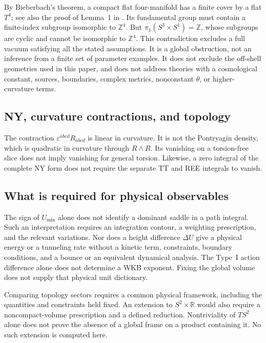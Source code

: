 By Bieberbach's theorem, a compact flat four-manifold has a finite
cover by a flat $T^4$; see also the proof of Lemma~1 in \cite{LeBrun2009}.
Its fundamental group must contain a finite-index subgroup
isomorphic to $\mathbb Z^4$.
But $\pi_1(S^3\times S^1)=\mathbb Z$, whose subgroups are cyclic and
cannot be isomorphic to $\mathbb Z^4$.
This contradiction excludes a full vacuum satisfying all the stated
assumptions. It is a global obstruction, not an inference from a finite
set of parameter examples.
It does not exclude the off-shell geometries used in this paper,
and does not address theories with a cosmological constant, sources,
boundaries, complex metrics, nonconstant $\theta$, or higher-curvature terms.

\subsection{NY, curvature contractions, and topology}
The contraction $\varepsilon^{abcd}R_{abcd}$ is linear in curvature.
It is not the Pontryagin density, which is quadratic in curvature
through $R\wedge R$.
Its vanishing on a torsion-free slice does not imply vanishing for
general torsion.
Likewise, a zero integral of the complete NY form does not require
the separate TT and REE integrals to vanish.

\subsection{What is required for physical observables}
The sign of $U_{\min}$ alone does not identify a dominant saddle in a
path integral. Such an interpretation requires an integration contour,
a weighting prescription, and the relevant variations.
Nor does a height difference $\Delta U$ give a physical energy or
a tunneling rate without a kinetic term, constraints, boundary conditions,
and a bounce or an equivalent dynamical analysis.
The Type~I action difference alone does not determine a WKB exponent.
Fixing the global volume does not supply that physical unit dictionary.

Comparing topology sectors requires a common physical framework,
including the quantities and constraints held fixed.
An extension to $S^2\times\mathbb R$ would also require a noncompact-volume
prescription and a defined reduction.
Nontriviality of $TS^2$ alone does not prove the absence of a global frame
on a product containing it. No such extension is computed here.
